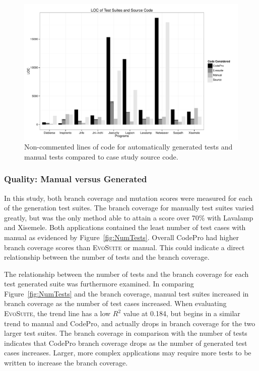 


\begin{figure}[!t]
\centering
  \includegraphics[scale=0.5]{RGraphs/LOC.pdf}
    \caption{Non-commented lines of code for automatically generated tests and manual tests compared to case study source code. }
  \label{fig:LOC}
\end{figure}


\subsubsection{Quality: Manual versus Generated}
In this study, both branch coverage and mutation scores were measured for each of the generation test suites. The branch coverage for manually test suites varied greatly, but was the only method  able to attain a score over 70\% with Lavalamp and Xisemele. Both applications contained the least number of test cases with manual as evidenced by  Figure~\ref{fig:NumTests}. Overall CodePro had higher branch coverage scores than \textsc{EvoSuite} or manual. This could indicate a direct relationship between the number of tests and the branch coverage. 

The relationship between the number of tests and the branch coverage for each test generated suite was furthermore examined. In comparing Figure~\ref{fig:NumTests} and the branch coverage, manual test suites increased in branch coverage as the number of test cases increased. When evaluating \textsc{EvoSuite}, the trend line has a low  $R^2$ value at 0.184, but begins in a similar trend to manual and CodePro, and actually drops in branch coverage for the two larger test suites. The branch coverage in comparison with the number of tests indicates that CodePro branch coverage drops as the number of generated test cases increases. Larger, more complex applications may require more tests to be written to increase the branch coverage. 

